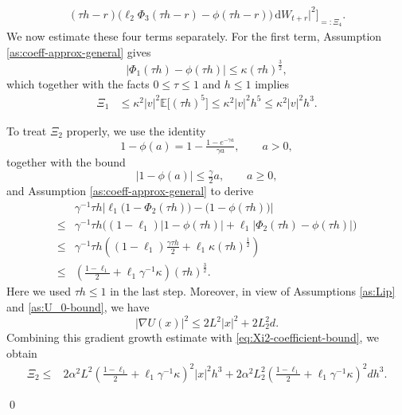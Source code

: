 \documentclass[12pt]{article}
\numberwithin{equation}{section}
\renewenvironment{proof}%
  {\begin{trivlist}%
   \item[]\ignorespaces}%
  {\qed\end{trivlist}}
\newcommand{\dd}{\mathrm{d}}
\begin{document}
\begin{proof}
\begin{align}
{(\tau h-r)
\big(
\ell_2\Phi_3(\tau h-r)-\phi(\tau h-r)
\big)\,\dd W_{t+r}
\Big|^2
\Big]
}_{=:\Xi_4}.
\end{align}
We now estimate these four terms separately. 
For the first term, Assumption \ref{as:coeff-approx-general} gives
\[
\big|
\Phi_1(\tau h)-\phi(\tau h)
\big|
\leq
\kappa(\tau h)^{\frac{3}{2}},
\]
which together with the facts \(0\leq\tau\leq1\) and \(h\leq1\) implies
\begin{equation}
\label{eq:Xi1-estimate}
\begin{aligned}
\Xi_1
&\leq
\kappa^2 |v|^2
\mathbb E
\big[
(\tau h)^5
\big]
\leq
\kappa^2 |v|^2 h^5
\leq
\kappa^2 |v|^2 h^3 .
\end{aligned}
\end{equation}

To treat \(\Xi_2\) properly, 
we use the identity
\[
1-\phi(a)
=
1-\tfrac{1-e^{-\gamma a}}{\gamma a},
\qquad a>0,
\]
together with the bound
\[
|1-\phi(a)|
\leq
\tfrac{\gamma }{2}a,
\qquad a\geq0,
\]
and Assumption \ref{as:coeff-approx-general} to derive
\begin{equation}
\label{eq:Xi2-coefficient-bound}
\begin{aligned}
&
\gamma^{-1}
\tau h
\Big|
\ell_1
\big(
1-\Phi_2(\tau h)
\big)
-
\big(
1-\phi(\tau h)
\big)
\Big|
\\
\leq&
\gamma^{-1}
\tau h
\Big(
(1-\ell_1)
\big|
1-\phi(\tau h)
\big|
+
\ell_1
\big|
\Phi_2(\tau h)-\phi(\tau h)
\big|
\Big)
\\
\leq&
\gamma^{-1}
\tau h
\left(
(1-\ell_1)
\tfrac{\gamma\tau h}{2}
+
\ell_1\kappa(\tau h)^{\frac{1}{2}}
\right)
\\
\leq&
\left(
\tfrac{1-\ell_1}{2}
+
\ell_1\gamma^{-1}\kappa
\right)
(\tau h)^{\frac{3}{2}}.
\end{aligned}
\end{equation}
Here we used \(\tau h\leq1\) in the last step. 
Moreover, in view of Assumptions \ref{as:Lip} and \ref{as:U_0-bound}, we have
\[
|\nabla U(x)|^2
\leq
2L^2|x|^2
+
2L_2^2d.
\]
Combining this gradient growth estimate with \eqref{eq:Xi2-coefficient-bound}, we obtain
\begin{equation}
\label{eq:Xi2-estimate}
\begin{aligned}
\Xi_2
\leq&
2\alpha^2L^2
\left(
\tfrac{1-\ell_1}{2}
+
\ell_1\gamma^{-1}\kappa
\right)^2
|x|^2h^3
+
2\alpha^2L_2^2
\left(
\tfrac{1-\ell_1}{2}
+
\ell_1\gamma^{-1}\kappa
\right)^2
dh^3 .
\end{aligned}
\end{equation}


\end{proof}
\end{document}
